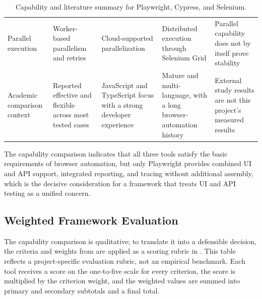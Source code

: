 \begin{table}[htbp]
\begin{tabularx}{\textwidth}{>{\RaggedRight\arraybackslash}p{}YYY>{\RaggedRight\arraybackslash}p{0.14\textwidth}}
    Parallel execution & Worker-based parallelism and retries \autocite{playwright_docs_parallelism_2026,playwright_docs_retries_2026} & Cloud-supported parallelization \autocite{cypress_docs_parallelization_2026} & Distributed execution through Selenium Grid \autocite{selenium_docs_grid_2026} & Parallel capability does not by itself prove stability \\
    Academic comparison context & Reported effective and flexible across most tested cases \autocite{mon_panczyk_tool_comparison_2025} & JavaScript and TypeScript focus with a strong developer experience & Mature and multi-language, with a long browser-automation history & External study results are not this project's measured results \\
    \bottomrule
  \end{tabularx}
  \caption{Capability and literature summary for Playwright, Cypress, and Selenium.}
  \label{tab:ch5-capability-literature-summary}
\end{table}

The capability comparison indicates that all three tools satisfy the basic requirements of browser automation, but only Playwright provides combined UI and API support, integrated reporting, and tracing without additional assembly, which is the decisive consideration for a framework that treats UI and API testing as a unified concern.

\subsection{Weighted Framework Evaluation}
\label{subsec:ch5-weighted-framework-evaluation}

The capability comparison is qualitative; to translate it into a defensible decision, the criteria and weights from  are applied as a scoring rubric in . This table reflects a project-specific evaluation rubric, not an empirical benchmark. Each tool receives a score on the one-to-five scale for every criterion, the score is multiplied by the criterion weight, and the weighted values are summed into primary and secondary subtotals and a final total.

